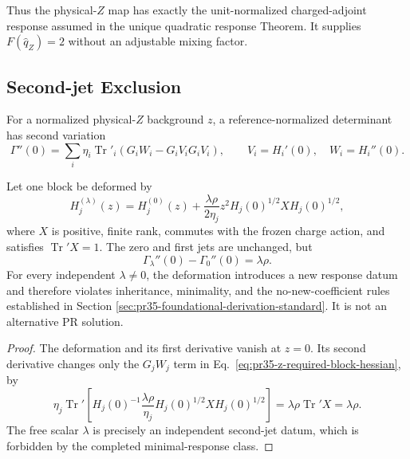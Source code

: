 Thus the physical-$Z$ map has exactly the unit-normalized charged-adjoint
response assumed in the unique quadratic response Theorem. It supplies $F(\widehat q_Z)=2$ without an adjustable mixing factor.

\subsection{Second-jet Exclusion}

For a normalized physical-$Z$ background $z$, a reference-normalized
determinant has second variation
\begin{equation}
 \Gamma''(0)=\sum_i\eta_i\operatorname{Tr}'_i
 \left(G_iW_i-G_iV_iG_iV_i\right),
 \qquad V_i=H_i'(0),\quad W_i=H_i''(0).
 \label{eq:pr35-z-required-block-hessian}
\end{equation}

\begin{theorem}
\label{thm:pr35-z-second-jet-nonuniqueness}
Let one block be deformed by
\begin{equation}
 H_j^{(\lambda)}(z)=H_j^{(0)}(z)
 +\frac{\lambda\rho}{2\eta_j}z^2H_j(0)^{1/2}XH_j(0)^{1/2},
 \label{eq:pr35-z-second-jet-family}
\end{equation}
where $X$ is positive, finite rank, commutes with the frozen charge action,
and satisfies $\operatorname{Tr}'X=1$.  The zero and first jets are unchanged,
but
\begin{equation}
 \Gamma_\lambda''(0)-\Gamma_0''(0)=\lambda\rho.
 \label{eq:pr35-z-second-jet-shift}
\end{equation}
For every independent $\lambda\ne0$, the deformation introduces a new response datum and therefore violates inheritance, minimality, and the no-new-coefficient rules established in Section \ref{sec:pr35-foundational-derivation-standard}.  It is not an alternative PR solution.
\end{theorem}

\begin{proof}
The deformation and its first derivative vanish at $z=0$.  Its second
derivative changes only the $G_jW_j$ term in
Eq.~\eqref{eq:pr35-z-required-block-hessian}, by
\begin{equation}
 \eta_j\operatorname{Tr}'\!\left[
 H_j(0)^{-1}\frac{\lambda\rho}{\eta_j}
 H_j(0)^{1/2}XH_j(0)^{1/2}\right]
 =\lambda\rho\operatorname{Tr}'X=\lambda\rho.
\end{equation}
The free scalar $\lambda$ is precisely an independent second-jet datum, which
is forbidden by the completed minimal-response class.
\end{proof}

